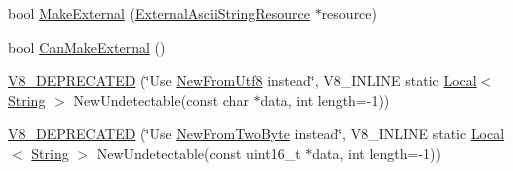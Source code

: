 \begin{DoxyCompactItemize}
\item 
bool \hyperlink{classv8_1_1_string_a19db11c97e2ce01244e06f5cbcd094f2}{Make\+External} (\hyperlink{classv8_1_1_string_1_1_external_ascii_string_resource}{External\+Ascii\+String\+Resource} $\ast$resource)
\item 
bool \hyperlink{classv8_1_1_string_a0fe076838af046506ffebbfadcde812a}{Can\+Make\+External} ()
\item 
\hyperlink{classv8_1_1_string_a4a40fc0351df1087b1955714ad52b3c8}{V8\+\_\+\+D\+E\+P\+R\+E\+C\+A\+T\+E\+D} (\char`\"{}Use \hyperlink{classv8_1_1_string_aa4b8c052f5108ca6350c45922602b9d4}{New\+From\+Utf8} instead\char`\"{}, V8\+\_\+\+I\+N\+L\+I\+N\+E static \hyperlink{classv8_1_1_local}{Local}$<$ \hyperlink{classv8_1_1_string}{String} $>$ New\+Undetectable(const char $\ast$data, int length=-\/1))
\item 
\hyperlink{classv8_1_1_string_a5f11784f84d36e721a8c7560518ae020}{V8\+\_\+\+D\+E\+P\+R\+E\+C\+A\+T\+E\+D} (\char`\"{}Use \hyperlink{classv8_1_1_string_a876615eb027092a6a71a4e7d69b82d00}{New\+From\+Two\+Byte} instead\char`\"{}, V8\+\_\+\+I\+N\+L\+I\+N\+E static \hyperlink{classv8_1_1_local}{Local}$<$ \hyperlink{classv8_1_1_string}{String} $>$ New\+Undetectable(const uint16\+\_\+t $\ast$data, int length=-\/1))
\end{DoxyCompactItemize}
